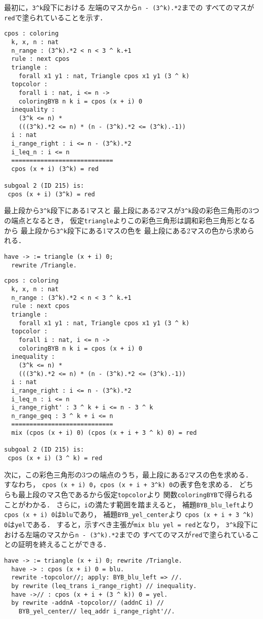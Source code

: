 最初に，{\tt{3\verb|^|k}}段下における
左端のマスから{\tt{n - (3\verb|^|k).*2}}までの
すべてのマスが{\tt{red}}で塗られていることを示す．
\begin{lstlisting}[language=Coq]
  cpos : coloring
  k, x, n : nat
  n_range : (3^k).*2 < n < 3 ^ k.+1
  rule : next cpos
  triangle :
    forall x1 y1 : nat, Triangle cpos x1 y1 (3 ^ k)
  topcolor :
    forall i : nat, i <= n ->
    coloringBYB n k i = cpos (x + i) 0
  inequality :
    (3^k <= n) *
    (((3^k).*2 <= n) * (n - (3^k).*2 <= (3^k).-1))
  i : nat
  i_range_right : i <= n - (3^k).*2
  i_leq_n : i <= n
  ============================
  cpos (x + i) (3^k) = red

subgoal 2 (ID 215) is:
 cpos (x + i) (3^k) = red
\end{lstlisting}
最上段から{\tt{3\verb|^|k}}段下にある1マスと
最上段にある2マスが{\tt{3\verb|^|k}}段の彩色三角形の3つの端点となるとき，
仮定{\tt{triangle}}よりこの彩色三角形は調和彩色三角形となるから
最上段から{\tt{3\verb|^|k}}段下にある1マスの色を
最上段にある2マスの色から求められる．
\begin{lstlisting}[language=Coq]
  have -> := triangle (x + i) 0;
  rewrite /Triangle.
\end{lstlisting}
\begin{lstlisting}[language=Coq]
  cpos : coloring
  k, x, n : nat
  n_range : (3^k).*2 < n < 3 ^ k.+1
  rule : next cpos
  triangle :
    forall x1 y1 : nat, Triangle cpos x1 y1 (3 ^ k)
  topcolor :
    forall i : nat, i <= n ->
    coloringBYB n k i = cpos (x + i) 0
  inequality :
    (3^k <= n) *
    (((3^k).*2 <= n) * (n - (3^k).*2 <= (3^k).-1))
  i : nat
  i_range_right : i <= n - (3^k).*2
  i_leq_n : i <= n
  i_range_right' : 3 ^ k + i <= n - 3 ^ k
  n_range_geq : 3 ^ k + i <= n
  ============================
  mix (cpos (x + i) 0) (cpos (x + i + 3 ^ k) 0) = red

subgoal 2 (ID 215) is:
 cpos (x + i) (3 ^ k) = red
\end{lstlisting}
次に，この彩色三角形の3つの端点のうち，最上段にある2マスの色を求める．
すなわち，
{\tt{cpos (x + i) 0}}，{\tt{cpos (x + i + 3\verb|^|k) 0}}の表す色を求める．
どちらも最上段のマス色であるから仮定{\tt{topcolor}}より
関数{\tt{coloringBYB}}で得られることがわかる．
さらに，{\tt{i}}の満たす範囲を踏まえると，
補題{\tt{BYB\_blu\_left}}より
{\tt{cpos (x + i) 0}}は{\tt{blu}}であり，
補題{\tt{BYB\_yel\_center}}より
{\tt{cpos (x + i + 3 \verb|^|k) 0}}は{\tt{yel}}である．
すると，示すべき主張が{\tt{mix blu yel = red}}となり，
{\tt{3\verb|^|k}}段下における左端のマスから{\tt{n - (3\verb|^|k).*2}}までの
すべてのマスが{\tt{red}}で塗られていることの証明を終えることができる．
\begin{lstlisting}[language=Coq]
  have -> := triangle (x + i) 0; rewrite /Triangle.
  have -> : cpos (x + i) 0 = blu.
  rewrite -topcolor//; apply: BYB_blu_left => //.
  by rewrite (leq_trans i_range_right) // inequality.
  have ->// : cpos (x + i + (3 ^ k)) 0 = yel.
  by rewrite -addnA -topcolor// (addnC i) //
    BYB_yel_center// leq_addr i_range_right'//.
\end{lstlisting}

